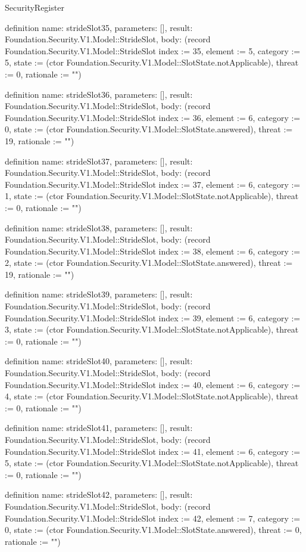 \begin{lexlean}{SecurityRegister}
\begin{semanticmodule}
definition{
  name: strideSlot35,
  parameters: [],
  result: Foundation.Security.V1.Model::StrideSlot,
  body: (record Foundation.Security.V1.Model::StrideSlot {index := 35, element := 5, category := 5, state := (ctor Foundation.Security.V1.Model::SlotState.notApplicable), threat := 0, rationale := ""})
}

definition{
  name: strideSlot36,
  parameters: [],
  result: Foundation.Security.V1.Model::StrideSlot,
  body: (record Foundation.Security.V1.Model::StrideSlot {index := 36, element := 6, category := 0, state := (ctor Foundation.Security.V1.Model::SlotState.answered), threat := 19, rationale := ""})
}

definition{
  name: strideSlot37,
  parameters: [],
  result: Foundation.Security.V1.Model::StrideSlot,
  body: (record Foundation.Security.V1.Model::StrideSlot {index := 37, element := 6, category := 1, state := (ctor Foundation.Security.V1.Model::SlotState.notApplicable), threat := 0, rationale := ""})
}

definition{
  name: strideSlot38,
  parameters: [],
  result: Foundation.Security.V1.Model::StrideSlot,
  body: (record Foundation.Security.V1.Model::StrideSlot {index := 38, element := 6, category := 2, state := (ctor Foundation.Security.V1.Model::SlotState.answered), threat := 19, rationale := ""})
}

definition{
  name: strideSlot39,
  parameters: [],
  result: Foundation.Security.V1.Model::StrideSlot,
  body: (record Foundation.Security.V1.Model::StrideSlot {index := 39, element := 6, category := 3, state := (ctor Foundation.Security.V1.Model::SlotState.notApplicable), threat := 0, rationale := ""})
}

definition{
  name: strideSlot40,
  parameters: [],
  result: Foundation.Security.V1.Model::StrideSlot,
  body: (record Foundation.Security.V1.Model::StrideSlot {index := 40, element := 6, category := 4, state := (ctor Foundation.Security.V1.Model::SlotState.notApplicable), threat := 0, rationale := ""})
}

definition{
  name: strideSlot41,
  parameters: [],
  result: Foundation.Security.V1.Model::StrideSlot,
  body: (record Foundation.Security.V1.Model::StrideSlot {index := 41, element := 6, category := 5, state := (ctor Foundation.Security.V1.Model::SlotState.notApplicable), threat := 0, rationale := ""})
}

definition{
  name: strideSlot42,
  parameters: [],
  result: Foundation.Security.V1.Model::StrideSlot,
  body: (record Foundation.Security.V1.Model::StrideSlot {index := 42, element := 7, category := 0, state := (ctor Foundation.Security.V1.Model::SlotState.answered), threat := 0, rationale := ""})
}


\end{semanticmodule}
\end{lexlean}
